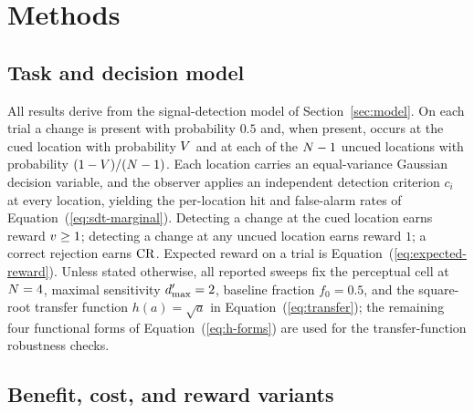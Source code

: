 
\section{Methods}
\label{sec:methods}

\subsection{Task and decision model}
\label{sec:methods-model}

All results derive from the signal-detection model of
Section~\ref{sec:model}. On each trial a change is present with
probability $0.5$ and, when present, occurs at the cued location with
probability $V$ and at each of the $N - 1$ uncued locations
with probability $(1 - V)/(N - 1)$. Each location carries an
equal-variance Gaussian decision variable, and the observer applies an
independent detection criterion $c_i$ at every location, yielding the
per-location hit and false-alarm rates of
Equation~(\ref{eq:sdt-marginal}). Detecting a change at the cued
location earns reward $v \ge 1$; detecting a change at any uncued
location earns reward $1$; a correct rejection earns $\mathrm{CR}$. Expected
reward on a trial is Equation~(\ref{eq:expected-reward}). Unless stated
otherwise, all reported sweeps fix the perceptual cell at $N = 4$,
maximal sensitivity $d'_{\max} = 2$, baseline fraction $f_0 = 0.5$, and
the square-root transfer function $h(a) = \sqrt{a}$ in
Equation~(\ref{eq:transfer}); the remaining four functional forms of
Equation~(\ref{eq:h-forms}) are used for the transfer-function
robustness checks.

\subsection{Benefit, cost, and reward variants}
\label{sec:methods-asymmetry}

